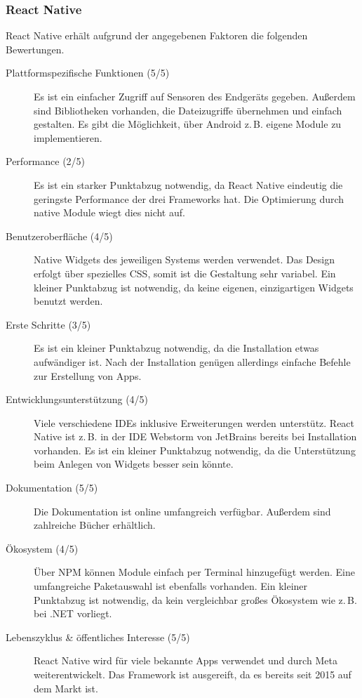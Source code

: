 \documentclass[]{lni}
\begin{document}
\subsubsection{React Native}
React Native erhält aufgrund der angegebenen Faktoren die folgenden Bewertungen.
\begin{description}
	\item[Plattformspezifische Funktionen (5/5)] Es ist ein einfacher Zugriff auf Sensoren des Endgeräts gegeben. Außerdem sind Bibliotheken vorhanden, die Dateizugriffe übernehmen und einfach gestalten. Es gibt die Möglichkeit, über Android z.\,B. eigene Module zu implementieren.
	\item[Performance (2/5)] Es ist ein starker Punktabzug notwendig, da React Native eindeutig die geringste Performance der drei Frameworks hat. Die Optimierung durch native Module wiegt dies nicht auf.
	\item[Benutzeroberfläche (4/5)] Native Widgets des jeweiligen Systems werden verwendet. Das Design erfolgt über spezielles CSS, somit ist die Gestaltung sehr variabel. Ein kleiner Punktabzug ist notwendig, da keine eigenen, einzigartigen Widgets benutzt werden.
	\item[Erste Schritte (3/5)] Es ist ein kleiner Punktabzug notwendig, da die Installation etwas aufwändiger ist. Nach der Installation genügen allerdings einfache Befehle zur Erstellung von Apps.
	\item[Entwicklungsunterstützung (4/5)] Viele verschiedene IDEs inklusive Erweiterungen werden unterstütz. React Native ist z.\,B. in der IDE Webstorm von JetBrains bereits bei Installation vorhanden. Es ist ein kleiner Punktabzug notwendig, da die Unterstützung beim Anlegen von Widgets besser sein könnte.
	\item[Dokumentation (5/5)] Die Dokumentation ist online umfangreich verfügbar. Außerdem sind zahlreiche Bücher erhältlich.
	\item[Ökosystem (4/5)] Über NPM können Module einfach per Terminal hinzugefügt werden. Eine umfangreiche Paketauswahl ist ebenfalls vorhanden. Ein kleiner Punktabzug ist notwendig, da kein vergleichbar großes Ökosystem wie z.\,B. bei .NET vorliegt.
	\item[Lebenszyklus \& öffentliches Interesse (5/5)] React Native wird für viele bekannte Apps verwendet und durch Meta weiterentwickelt. Das Framework ist ausgereift, da es bereits seit 2015 auf dem Markt ist.
\end{description}
\end{document}
